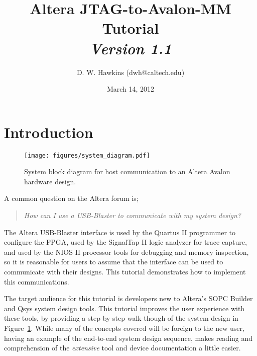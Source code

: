 \documentclass[10pt,twoside]{article}
\begin{document}
\title{Altera JTAG-to-Avalon-MM Tutorial\\
{\large \em Version 1.1}}
\author{D. W. Hawkins (dwh@caltech.edu)}
\date{March 14, 2012}
\maketitle

\thispagestyle{empty}

\tableofcontents

\cleardoublepage

\pagestyle{fancy}
\chead{}
\rhead{\today}
\lfoot{}
\cfoot{}
\rfoot{\thepage}
\renewcommand{\headrulewidth}{0.4pt}
\renewcommand{\footrulewidth}{0.4pt}

\lstset{language=Tcl}

\section{Introduction}

\begin{figure}[t]
  \begin{center}
    \texttt{[image: figures/system\_diagram.pdf]}
  \end{center}
  \caption{System block diagram for host communication to an
  Altera Avalon hardware design.}
  \label{fig:system_diagram}
\end{figure}

A common question on the Altera forum is;
%
\begin{quote}
\em How can I use a USB-Blaster to communicate with my system design?
\end{quote}
%
The Altera USB-Blaster interface is used by the Quartus II
programmer to configure the FPGA, used by the SignalTap II logic 
analyzer for trace capture, and used by the NIOS II processor
tools for debugging and memory inspection, so it is reasonable
for users to assume that the interface can be used
to communicate with their designs. This tutorial demonstrates
how to implement this communications.

The target audience for this tutorial is developers new to Altera's 
SOPC Builder and Qsys system design tools.  This tutorial improves
the user experience with these tools, by providing a step-by-step
walk-though of the system design in Figure~\ref{fig:system_diagram}.
While many of the concepts covered will be foreign to the new user,
having an example of the end-to-end system design sequence, makes
reading and comprehension of the {\em extensive} tool and device 
documentation a little easier.
\end{document}
